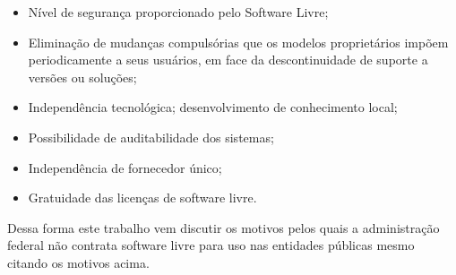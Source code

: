 \begin{itemize}

\item Nível de segurança proporcionado pelo Software Livre;
\item Eliminação de mudanças compulsórias que os modelos proprietários impõem
periodicamente a seus usuários, em face da descontinuidade de suporte a
versões ou soluções; 
\item Independência tecnológica; desenvolvimento de
conhecimento local; 
\item Possibilidade de auditabilidade dos sistemas;
\item Independência de fornecedor único;
\item Gratuidade das licenças de software livre.
\end{itemize}

Dessa forma este trabalho vem discutir os motivos pelos quais a administração 
federal não contrata software livre para uso nas entidades públicas mesmo citando 
os motivos acima.


